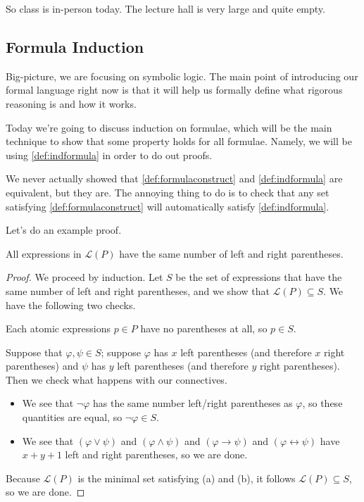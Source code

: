 
So class is in-person today. The lecture hall is very large and quite empty.

\subsection{Formula Induction}
Big-picture, we are focusing on symbolic logic. The main point of introducing our formal language right now is that it will help us formally define what rigorous reasoning is and how it works.

Today we're going to discuss induction on formulae, which will be the main technique to show that some property holds for all formulae. Namely, we will be using \autoref{def:indformula} in order to do out proofs.
\begin{remark}
	We never actually showed that \autoref{def:formulaconstruct} and \autoref{def:indformula} are equivalent, but they are. The annoying thing to do is to check that any set satisfying \autoref{def:formulaconstruct} will automatically satisfy \autoref{def:indformula}.
\end{remark}
Let's do an example proof.
\begin{proposition}
	All expressions in $\mathcal L(P)$ have the same number of left and right parentheses.
\end{proposition}
\begin{proof}
	We proceed by induction. Let $S$ be the set of expressions that have the same number of left and right parentheses, and we show that $\mathcal L(P)\subseteq S$. We have the following two checks.
	\begin{listalph}
		\item Each atomic expressions $p\in P$ have no parentheses at all, so $p\in S$.
		\item Suppose that $\varphi,\psi\in S$; suppose $\varphi$ has $x$ left parentheses (and therefore $x$ right parentheses) and $\psi$ has $y$ left parentheses (and therefore $y$ right parentheses). Then we check what happens with our connectives.
		\begin{itemize}
			\item We see that $\lnot\varphi$ has the same number left/right parentheses as $\varphi$, so these quantities are equal, so $\lnot\varphi\in S$.
			\item We see that $(\varphi\lor\psi)$ and $(\varphi\land\psi)$ and $(\varphi\to\psi)$ and $(\varphi\leftrightarrow\psi)$ have $x+y+1$ left and right parentheses, so we are done.
		\end{itemize}
	\end{listalph}
	Because $\mathcal L(P)$ is the minimal set satisfying (a) and (b), it follows $\mathcal L(P)\subseteq S$, so we are done.
\end{proof}
